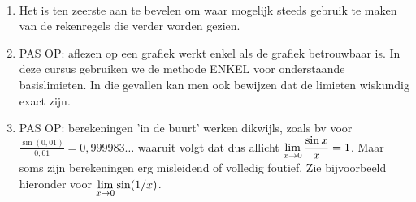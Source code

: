 \documentclass{ximera}
\begin{document}
\begin{remark} \ 
	
	\begin{enumerate}
		\item Het is ten zeerste aan te bevelen om waar mogelijk steeds gebruik te maken van de rekenregels die verder worden gezien.
		\item PAS OP: aflezen op een grafiek werkt enkel als de grafiek betrouwbaar is. In deze cursus gebruiken we de methode ENKEL voor onderstaande basislimieten. In die gevallen kan men ook bewijzen dat de limieten wiskundig exact zijn.
		\item PAS OP: berekeningen 'in de buurt' werken dikwijls, zoals bv voor $\frac{\sin(0,01)}{0,01}=0,999983\dots$ waaruit volgt dat dus allicht $\limx \frac{\sin x}{x} = 1$. Maar soms zijn berekeningen erg misleidend of volledig foutief. Zie bijvoorbeeld hieronder voor $\limx \sin(1/x)$.
	\end{enumerate}
\end{remark}
\end{document}
